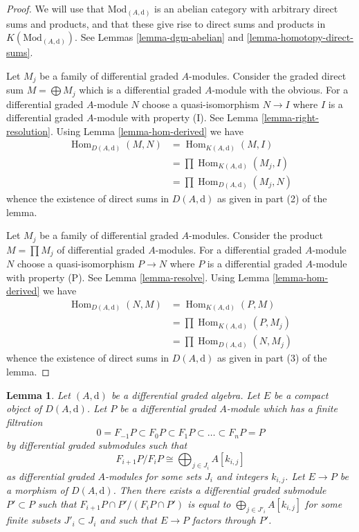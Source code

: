 \documentclass{stacks-project}
\theoremstyle{plain}
\newtheorem{lemma}[subsection]{Lemma}
\theoremstyle{definition}
\theoremstyle{remark}
\numberwithin{equation}{subsection}
\def\Hom{\mathop{\mathrm{Hom}}\nolimits}
\begin{document}
\begin{proof}
We will use that $\text{Mod}_{(A, \text{d})}$ is an abelian category
with arbitrary direct sums and products, and that these give rise
to direct sums and products in $K(\text{Mod}_{(A, \text{d})})$.
See Lemmas \ref{lemma-dgm-abelian} and \ref{lemma-homotopy-direct-sums}.

\medskip\noindent
Let $M_j$ be a family of differential graded $A$-modules.
Consider the graded direct sum $M = \bigoplus M_j$ which is a
differential graded $A$-module with the obvious.
For a differential graded $A$-module $N$ choose a quasi-isomorphism
$N \to I$ where $I$ is a differential graded $A$-module with property (I).
See Lemma \ref{lemma-right-resolution}.
Using Lemma \ref{lemma-hom-derived} we have
\begin{align*}
\Hom_{D(A, \text{d})}(M, N)
& =
\Hom_{K(A, \text{d})}(M, I) \\
& =
\prod \Hom_{K(A, \text{d})}(M_j, I) \\
& =
\prod \Hom_{D(A, \text{d})}(M_j, N)
\end{align*}
whence the existence of direct sums in $D(A, \text{d})$ as given in
part (2) of the lemma.

\medskip\noindent
Let $M_j$ be a family of differential graded $A$-modules.
Consider the product $M = \prod M_j$ of differential graded $A$-modules.
For a differential graded $A$-module $N$ choose a quasi-isomorphism
$P \to N$ where $P$ is a differential graded $A$-module with property (P).
See Lemma \ref{lemma-resolve}.
Using Lemma \ref{lemma-hom-derived} we have
\begin{align*}
\Hom_{D(A, \text{d})}(N, M)
& =
\Hom_{K(A, \text{d})}(P, M) \\
& =
\prod \Hom_{K(A, \text{d})}(P, M_j) \\
& =
\prod \Hom_{D(A, \text{d})}(N, M_j)
\end{align*}
whence the existence of direct sums in $D(A, \text{d})$ as given in
part (3) of the lemma.
\end{proof}

\begin{lemma}
\label{lemma-factor-through-nicer}
Let $(A, \text{d})$ be a differential graded algebra. Let $E$ be a compact
object of $D(A, \text{d})$. Let $P$ be a differential graded $A$-module
which has a finite filtration
$$
0 = F_{-1}P \subset F_0P \subset F_1P \subset \ldots \subset F_nP = P
$$
by differential graded submodules such that
$$
F_{i + 1}P/F_iP \cong \bigoplus\nolimits_{j \in J_i} A[k_{i, j}]
$$
as differential graded $A$-modules for some sets $J_i$ and integers $k_{i, j}$.
Let $E \to P$ be a morphism of $D(A, \text{d})$.
Then there exists a differential graded submodule $P' \subset P$ such that
$F_{i + 1}P \cap P'/(F_iP \cap P')$ is equal to
$\bigoplus_{j \in J'_i} A[k_{i, j}]$ for some finite subsets
$J'_i \subset J_i$ and such that $E \to P$ factors through $P'$.
\end{lemma}
\end{document}
